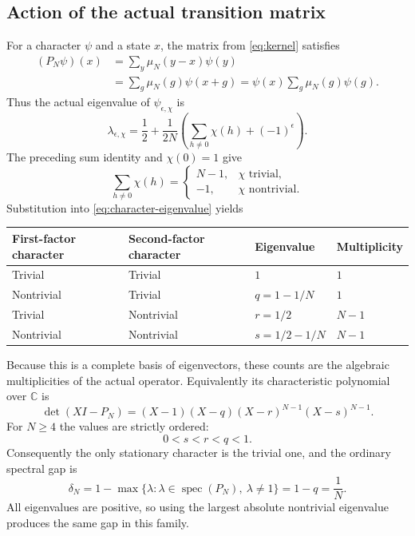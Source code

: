 \documentclass[11pt,a4paper]{article}
\theoremstyle{definition}
\theoremstyle{remark}
\newcommand{\C}{\mathbb C}
\newcommand{\spec}{\operatorname{spec}}
\begin{document}
\subsection{Action of the actual transition matrix}

For a character $\psi$ and a state $x$, the matrix from \eqref{eq:kernel}
satisfies
\begin{align*}
(P_N\psi)(x)
&=\sum_y\mu_N(y-x)\psi(y)\\
&=\sum_g\mu_N(g)\psi(x+g)
 =\psi(x)\sum_g\mu_N(g)\psi(g).
\end{align*}
Thus the actual eigenvalue of $\psi_{\epsilon,\chi}$ is
\begin{equation}\label{eq:character-eigenvalue}
\lambda_{\epsilon,\chi}
=\frac12+\frac1{2N}\left(\sum_{h\ne0}\chi(h)+(-1)^\epsilon\right).
\end{equation}
The preceding sum identity and $\chi(0)=1$ give
\[
\sum_{h\ne0}\chi(h)=
\begin{cases}N-1,&\chi\text{ trivial},\\-1,&\chi\text{ nontrivial}.
\end{cases}
\]
Substitution into \eqref{eq:character-eigenvalue} yields
\begin{center}
\begin{tabular}{@{}llll@{}}
\toprule
First-factor character&Second-factor character&Eigenvalue&Multiplicity\\
\midrule
Trivial&Trivial&$1$&$1$\\
Nontrivial&Trivial&$q=1-1/N$&$1$\\
Trivial&Nontrivial&$r=1/2$&$N-1$\\
Nontrivial&Nontrivial&$s=1/2-1/N$&$N-1$\\
\bottomrule
\end{tabular}
\end{center}
Because this is a complete basis of eigenvectors, these counts are the
algebraic multiplicities of the actual operator. Equivalently its
characteristic polynomial over $\C$ is
\begin{equation}\label{eq:charpoly}
\det(XI-P_N)=(X-1)(X-q)(X-r)^{N-1}(X-s)^{N-1}.
\end{equation}
For $N\ge4$ the values are strictly ordered:
\begin{equation}\label{eq:ordering}
0<s<r<q<1.
\end{equation}
Consequently the only stationary character is the trivial one, and the
ordinary spectral gap is
\[
\delta_N=1-\max\{\lambda:\lambda\in\spec(P_N),\ \lambda\ne1\}
=1-q=\frac1N.
\]
All eigenvalues are positive, so using the largest absolute nontrivial
eigenvalue produces the same gap in this family.
\end{document}
